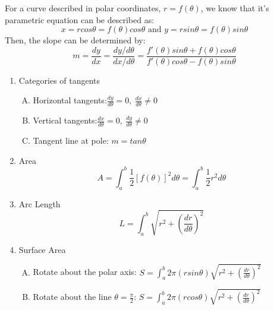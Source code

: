 \documentclass[12px]{article}
\begin{document}
\begin{enumerate}
    For a curve described in polar coordinates, $r=f(\theta)$, we know that it’s parametric equation can be described as:
    $$x=rcos\theta=f(\theta)cos\theta\text{ and }y=rsin\theta=f(\theta)sin\theta$$
\newpage
    Then, the slope can be determined by:
    $$m=\frac{dy}{dx}=\frac{dy/d\theta}{dx/d\theta}=\frac{f'(\theta)sin\theta+f(\theta)cos\theta}{f'(\theta)cos\theta-f(\theta)sin\theta}$$
    \begin{enumerate}[(1)]
        \item Categories of tangents
        \begin{enumerate}[A.]
            \item Horizontal tangents:$\frac{dy}{d\theta}=0,\ \frac{dx}{d\theta}\neq0$
            \item Vertical tangents:$\frac{dx}{d\theta}=0,\ \frac{dy}{d\theta}\neq0$
            \item Tangent line at pole: $m=tan\theta$
        \end{enumerate}
        \item Area
        $$A=\int_a^b\frac{1}{2}[f(\theta)]^2d\theta=\int_a^b\frac{1}{2}r^2d\theta$$
        \item Arc Length
        $$L=\int_a^b\sqrt{r^2+(\frac{dr}{d\theta})^2}$$
        \item Surface Area
        \begin{enumerate}[A.]
            \item Rotate about the polar axis: $S=\int_a^b2\pi(rsin\theta)\sqrt{r^2+(\frac{dr}{d\theta})^2}$
            \item Rotate about the line $\theta=\frac{\pi}{2}$: $S=\int_a^b2\pi(rcos\theta)\sqrt{r^2+(\frac{dr}{d\theta})^2}$
        \end{enumerate}
    \end{enumerate}
\end{enumerate}\leavevmode\newline
\end{document}
